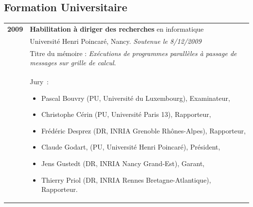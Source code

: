 \documentclass[11pt]{article}
\begin{document}
\subsection{Formation Universitaire}
\medskip
\noindent
\begin{tabular}{lp{14.8cm}}
	\textbf{2009} &  \textbf{Habilitation à diriger des recherches} en informatique \\
			  &	Université Henri Poincaré, Nancy. \textit{Soutenue le 8/12/2009}\\
      		  &	Titre du mémoire : {\em Exécutions de programmes parallèles à passage de messages sur grille de calcul}.\\
			  &	Jury~: 
				\begin{small}
				\begin{itemize}
				\item Pascal Bouvry (PU, Université du Luxembourg), Examinateur,
				\item Christophe Cérin (PU, Université Paris 13), Rapporteur,
				\item Frédéric Desprez (DR, INRIA Grenoble Rhônes-Alpes), Rapporteur,
				\item Claude Godart, (PU, Université Henri Poincaré), Président,
				\item Jens Gustedt (DR, INRIA Nancy Grand-Est), Garant,
				\item Thierry Priol (DR, INRIA Rennes Bretagne-Atlantique), Rapporteur.
				\end{itemize}
				\end{small}\\[2mm]
	


\end{tabular}
\end{document}
